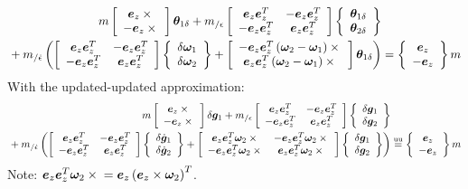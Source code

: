 \documentclass[10pt,dvips,fleqn,subeqn]{report}
\newcommand{\T}[1]{\bm{#1}}
\newcommand{\equu}{\overset{\text{uu}}{=}}
\begin{document}
\begin{align}
	m \sqbr{\matr{c}{
		\T{e}_z \times{}
		\\
		-\T{e}_z \times{}
	}} \T{\theta}_{1\delta}
	+
	m_{/\epsilon} \sqbr{\matr{cc}{
		\T{e}_z \T{e}_z^T & -\T{e}_z \T{e}_z^T
		\\
		-\T{e}_z \T{e}_z^T & \T{e}_z \T{e}_z^T
	}} \cubr{\cvvect{
		\T{\theta}_{1\delta}
		\\
		\T{\theta}_{2\delta}
	}}
	& \nonumber \\
	\mbox{} +
	m_{/\dot{\epsilon}} \plbr{
	\sqbr{\matr{cc}{
		\T{e}_z \T{e}_z^T & -\T{e}_z \T{e}_z^T
		\\
		-\T{e}_z \T{e}_z^T & \T{e}_z \T{e}_z^T
	}} \cubr{\cvvect{
		\delta\T{\omega}_1
		\\
		\delta\T{\omega}_2
	}}
	+
	\sqbr{\matr{c}{
		-\T{e}_z \T{e}_z^T \plbr{\T{\omega}_2 - \T{\omega}_1}\times{}
		\\
		\T{e}_z \T{e}_z^T \plbr{\T{\omega}_2 - \T{\omega}_1}\times{}
	}} \T{\theta}_{1\delta}
	}
	&=
	\cubr{\cvvect{
		\T{e}_z
		\\
		-\T{e}_z
	}} m
\end{align}
With the updated-updated approximation:
\begin{align}
	m \sqbr{\matr{c}{
		\T{e}_z \times{}
		\\
		-\T{e}_z \times{}
	}} \delta\T{g}_1
	+
	m_{/\epsilon} \sqbr{\matr{cc}{
		\T{e}_z \T{e}_z^T & -\T{e}_z \T{e}_z^T
		\\
		-\T{e}_z \T{e}_z^T & \T{e}_z \T{e}_z^T
	}} \cubr{\cvvect{
		\delta\T{g}_1
		\\
		\delta\T{g}_2
	}}
	& \nonumber \\
	\mbox{} +
	m_{/\dot{\epsilon}} \plbr{
	\sqbr{\matr{cc}{
		\T{e}_z \T{e}_z^T & -\T{e}_z \T{e}_z^T
		\\
		-\T{e}_z \T{e}_z^T & \T{e}_z \T{e}_z^T
	}} \cubr{\cvvect{
		\delta\dot{\T{g}}_1
		\\
		\delta\dot{\T{g}}_2
	}}
	+
	\sqbr{\matr{cc}{
		\T{e}_z \T{e}_z^T \T{\omega}_2\times{} & -\T{e}_z \T{e}_z^T \T{\omega}_2\times{}
		\\
		-\T{e}_z \T{e}_z^T \T{\omega}_2\times{} & \T{e}_z \T{e}_z^T \T{\omega}_2\times{}
	}} \cubr{\cvvect{
		\delta\T{g}_1
		\\
		\delta\T{g}_2
	}}
	}
	&\equu
	\cubr{\cvvect{
		\T{e}_z
		\\
		-\T{e}_z
	}} m
\end{align}
Note: $\T{e}_z \T{e}_z^T \T{\omega}_2\times{} = \T{e}_z \plbr{\T{e}_z\times\T{\omega}_2}^T$.
\end{document}
